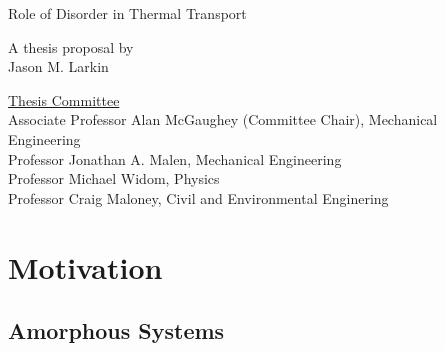 \documentclass[letterpaper,12pt]{article}
\begin{document}
\begin{center}



\centering

\vspace{1.1in}

\LARGE Role of Disorder in Thermal Transport\Large

\vspace{1in} A thesis proposal by\\Jason M. Larkin\\
\vspace{1.1in}


\parbox[h]{4in}{}

\thispagestyle{empty}
\end{center}
\vspace{2.in}
\parbox[b]{6.5in}{\noindent \underline{Thesis Committee}\\
\noindent Associate Professor Alan McGaughey (Committee Chair), Mechanical Engineering\\
Professor Jonathan A. Malen, Mechanical Engineering \\
Professor Michael Widom, Physics \\
Professor Craig Maloney, Civil and Environmental Enginering\\}

\clearpage

\tableofcontents

\clearpage

\section{\label{S-Motivation}Motivation}

\subsection{\label{S-Motivation-Amorphous}Amorphous Systems}
\end{document}
